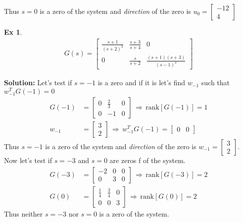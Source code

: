 \documentclass[twoside]{article}
\newtheorem{exmp}[theorem]{Ex}
\begin{document}
%
Thus $s = 0$ is a zero of the system and \textit{direction} of the zero is $u_0 = \begin{bmatrix} -12 \\ 4 \end{bmatrix} $
%
\begin{exmp}
	\begin{align*}
	G(s) = \left[ \begin{array}{ccc} \frac{s+1}{(s+2)^2} & \frac{s+3}{s+4} & 0 \\  
	0 & \frac{s}{s+2} & \frac{(s+1)(s+3)}{(s-1)^2}
        \end{array} \right]
	\end{align*}
\end{exmp}
%
\textbf{Solution:} Let's test if $s = -1$ is a zero and if it is let's find $w_{-1}$ such that $w_{-1}^T G(-1) = 0$
%
\begin{align*}
	G(-1) &= \left[ \begin{array}{ccc} 0 & \frac{2}{3} & 0 \\  
	0 & -1 & 0
        \end{array} \right] \, \Rightarrow \, \mathrm{rank}[G(-1)] = 1
        \\
        w_{-1} &= \begin{bmatrix} 3 \\ 2 \end{bmatrix} \, \Rightarrow \, w_{-1}^T G(-1) = \begin{bmatrix} 0 & 0 \end{bmatrix}
\end{align*}
%
Thus $s = -1$ is a zero of the system and \textit{direction} of the zero is $w_{-1} = \begin{bmatrix} 3 \\ 2 \end{bmatrix} $.
Now let's test if $s = -3$ and $s=0$ are zeros f of the system.
%
\begin{align*}
	G(-3) &= \left[ \begin{array}{ccc} -2 & 0 & 0 \\  
	0 & 3 & 0
        \end{array} \right] \, \Rightarrow \, \mathrm{rank}[G(-3)] = 2
        \\
        G(0) &= \left[ \begin{array}{ccc} \frac{1}{4} & \frac{3}{4} & 0 \\  
	0 & 0 & 3
        \end{array} \right] \, \Rightarrow \, \mathrm{rank}[G(0)] = 2
\end{align*}
%
Thus neither $s=-3$ nor $s=0$ is a zero of the system.
\end{document}
